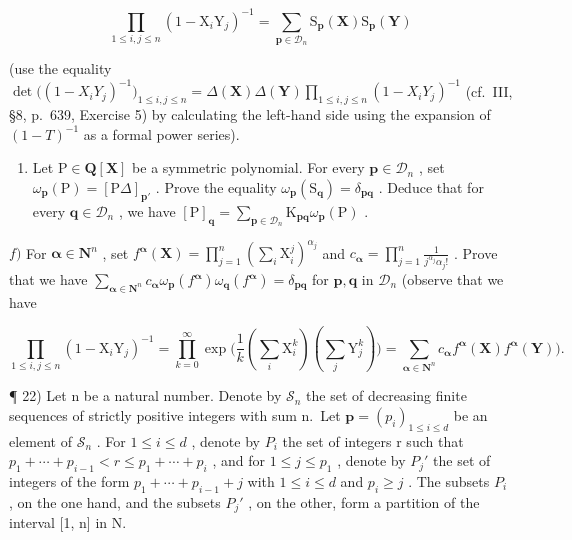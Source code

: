 \[
\prod_ {1 \leqslant i, j \leqslant n} (1 - \mathrm{X} _ {i} \mathrm{Y} _ {j}) ^ {- 1} = \sum_ {\mathbf {p} \in \mathcal {D} _ {n}} \mathrm{S} _ {\mathbf {p}} (\mathbf {X})   \mathrm{S} _ {\mathbf {p}} (\mathbf {Y})
\]

(use the equality \(\det\big((1 - X_iY_j)^{-1}\big)_{1\leqslant i,j\leqslant n} = \Delta(\mathbf{X})\Delta(\mathbf{Y})\prod_{1\leqslant i,j\leqslant n}(1 - X_iY_j)^{-1}\) (cf.~III, §8, p.~639, Exercise 5) by calculating the left-hand side using the expansion of \((1 - T)^{-1}\) as a formal power series).

\begin{enumerate}
\def\labelenumi{\alph{enumi})}
\setcounter{enumi}{4}
\tightlist
\item
  Let \(\mathrm{P} \in \mathbf{Q}[\mathbf{X}]\) be a symmetric polynomial. For every \(\mathbf{p} \in \mathcal{D}_n\) , set \(\omega_{\mathbf{p}}(\mathrm{P}) = [\mathrm{P}\Delta]_{\mathbf{p}'}\) . Prove the equality \(\omega_{\mathbf{p}}(\mathrm{S}_{\mathbf{q}}) = \delta_{\mathbf{pq}}\) . Deduce that for every \(\mathbf{q} \in \mathcal{D}_n\) , we have \([\mathrm{P}]_{\mathbf{q}} = \sum_{\mathbf{p} \in \mathcal{D}_n} \mathrm{K}_{\mathbf{pq}} \omega_{\mathbf{p}}(\mathrm{P})\) .
\end{enumerate}

\(f)\) For \(\boldsymbol{\alpha}\in\mathbf{N}^{n}\) , set \(f^{\boldsymbol{\alpha}}(\mathbf{X})=\prod_{j=1}^{n}(\sum_{i}\mathrm{X}_{i}^{j})^{\alpha_{j}}\) and \(c_{\boldsymbol{\alpha}}=\prod_{j=1}^{n}\frac{1}{j^{\alpha_{j}}\alpha_{j}!}\) . Prove that we have \(\sum_{\boldsymbol{\alpha}\in\mathbf{N}^{n}}c_{\boldsymbol{\alpha}}\omega_{\mathbf{p}}(f^{\boldsymbol{\alpha}})\omega_{\mathbf{q}}(f^{\boldsymbol{\alpha}})=\delta_{\mathbf{pq}}\) for \(\mathbf{p},\mathbf{q}\) in \(\mathcal{D}_{n}\) (observe that we have

\[
\prod_ {1 \leqslant i, j \leqslant n} (1 - \mathrm{X} _ {i} \mathrm{Y} _ {j}) ^ {- 1} = \prod_ {k = 0} ^ {\infty} \exp \bigl (\frac {1}{k} (\sum_ {i} \mathrm{X} _ {i} ^ {k}) (\sum_ {j} \mathrm{Y} _ {j} ^ {k}) \bigr) = \sum_ {\boldsymbol {\alpha} \in \mathbf {N} ^ {n}} c _ {\boldsymbol {\alpha}} f ^ {\boldsymbol {\alpha}} (\mathbf {X}) f ^ {\boldsymbol {\alpha}} (\mathbf {Y}) \bigr).
\]

¶ 22) Let n be a natural number. Denote by \(\mathcal{S}_{n}\) the set of decreasing finite sequences of strictly positive integers with sum n.~Let \(\mathbf{p} = (p_{i})_{1 \leqslant i \leqslant d}\) be an element of \(\mathcal{S}_{n}\) . For \(1 \leqslant i \leqslant d\) , denote by \(P_{i}\) the set of integers r such that \(p_{1} + \cdots + p_{i-1} < r \leqslant p_{1} + \cdots + p_{i}\) , and for \(1 \leqslant j \leqslant p_{1}\) , denote by \(P_{j}'\) the set of integers of the form \(p_{1} + \cdots + p_{i-1} + j\) with \(1 \leqslant i \leqslant d\) and \(p_{i} \geqslant j\) . The subsets \(P_{i}\) , on the one hand, and the subsets \(P_{j}'\) , on the other, form a partition of the interval {[}1, n{]} in N.

